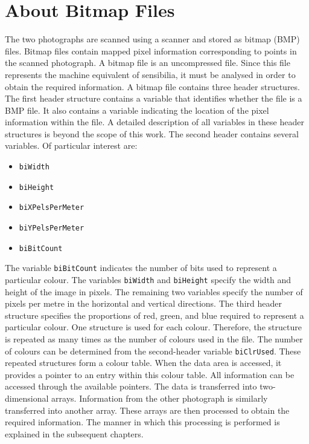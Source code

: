 \documentclass[12pt]{report}
\begin{document}
 \section{About Bitmap Files} The two photographs are scanned using a scanner and stored as bitmap (BMP) files. Bitmap files contain mapped pixel information corresponding to points in the scanned photograph. A bitmap file is an uncompressed file. Since this file represents the machine equivalent of sensibilia, it must be analysed in order to obtain the required information. A bitmap file contains three header structures. The first header structure contains a variable that identifies whether the file is a BMP file. It also contains a variable indicating the location of the pixel information within the file. A detailed description of all variables in these header structures is beyond the scope of this work. The second header contains several variables. Of particular interest are: 
 \begin{itemize} 
 \item \texttt{biWidth} \item \texttt{biHeight} \item \texttt{biXPelsPerMeter} \item \texttt{biYPelsPerMeter} \item \texttt{biBitCount} \end{itemize} The variable \texttt{biBitCount} indicates the number of bits used to represent a particular colour. The variables \texttt{biWidth} and \texttt{biHeight} specify the width and height of the image in pixels. The remaining two variables specify the number of pixels per metre in the horizontal and vertical directions. The third header structure specifies the proportions of red, green, and blue required to represent a particular colour. One structure is used for each colour. Therefore, the structure is repeated as many times as the number of colours used in the file. The number of colours can be determined from the second-header variable \texttt{biClrUsed}. These repeated structures form a colour table. When the data area is accessed, it provides a pointer to an entry within this colour table. All information can be accessed through the available pointers. The data is transferred into two-dimensional arrays. Information from the other photograph is similarly transferred into another array. These arrays are then processed to obtain the required information. The manner in which this processing is performed is explained in the subsequent chapters.
 
\end{document}
